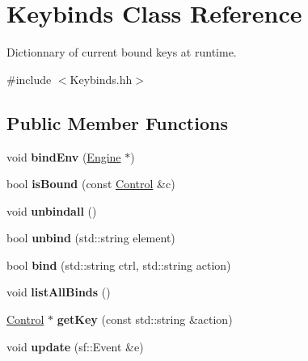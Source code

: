 \hypertarget{classKeybinds}{}\section{Keybinds Class Reference}
\label{classKeybinds}


Dictionnary of current bound keys at runtime.  




{\ttfamily \#include $<$Keybinds.\+hh$>$}

\subsection*{Public Member Functions}
\begin{DoxyCompactItemize}
\item 
void {\bfseries bind\+Env} (\hyperlink{classEngine}{Engine} $\ast$)\hypertarget{classKeybinds_a5c4adba1761c402fbaeb420581d8129a}{}\label{classKeybinds_a5c4adba1761c402fbaeb420581d8129a}

\item 
bool {\bfseries is\+Bound} (const \hyperlink{classControl}{Control} \&c)\hypertarget{classKeybinds_aea000ffe6db05fc86ae7b633789995d4}{}\label{classKeybinds_aea000ffe6db05fc86ae7b633789995d4}

\item 
void {\bfseries unbindall} ()\hypertarget{classKeybinds_a73e7a43eb5a9fafdc2401339d629f0cb}{}\label{classKeybinds_a73e7a43eb5a9fafdc2401339d629f0cb}

\item 
bool {\bfseries unbind} (std\+::string element)\hypertarget{classKeybinds_aabba4a7f59b9f28d1cbba27f4d0a0267}{}\label{classKeybinds_aabba4a7f59b9f28d1cbba27f4d0a0267}

\item 
bool {\bfseries bind} (std\+::string ctrl, std\+::string action)\hypertarget{classKeybinds_acc0ec1789a2c78c5955f6e907bc8cf22}{}\label{classKeybinds_acc0ec1789a2c78c5955f6e907bc8cf22}

\item 
void {\bfseries list\+All\+Binds} ()\hypertarget{classKeybinds_a52dc6c8bb44a91f4ca283201f3dd25bf}{}\label{classKeybinds_a52dc6c8bb44a91f4ca283201f3dd25bf}

\item 
\hyperlink{classControl}{Control} $\ast$ {\bfseries get\+Key} (const std\+::string \&action)\hypertarget{classKeybinds_a5c23b7711b852f0e516d07e628b78d46}{}\label{classKeybinds_a5c23b7711b852f0e516d07e628b78d46}

\item 
void {\bfseries update} (sf\+::\+Event \&e)\hypertarget{classKeybinds_a4b34b24b912157cb087a3ed2a35e2982}{}\label{classKeybinds_a4b34b24b912157cb087a3ed2a35e2982}

\end{DoxyCompactItemize}


